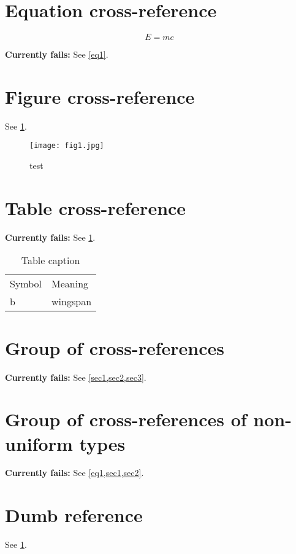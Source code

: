 \documentclass{article}
\begin{document}
\section{Equation cross-reference}\label{sec1}

$$
E=mc
\label{eq1}
$$

\textbf{Currently fails:}
See \cref{eq1}.


\section{Figure cross-reference}\label{sec2}

See \cref{fig1}.

\begin{figure}
\centering
\texttt{[image: fig1.jpg]}
\caption{test}\label{fig1}
\end{figure}


\section{Table cross-reference}\label{sec3}

\textbf{Currently fails:}
See \cref{tbl1}.

\begin{table}
\caption{Table caption}\label{tbl1}
\begin{tabular}{ll}
\hline
Symbol & Meaning \\
b & wingspan \\
\end{tabular}
\end{table}


\section{Group of cross-references}

\textbf{Currently fails:}
See \cref{sec1,sec2,sec3}.


\section{Group of cross-references of non-uniform types}

\textbf{Currently fails:}
See \cref{eq1,sec1,sec2}.


\section{Dumb reference}

See \ref{fig1}.
\end{document}
